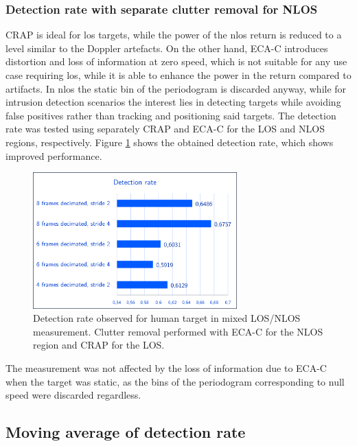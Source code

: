 \subsubsection{Detection rate with separate clutter removal for NLOS}

CRAP is ideal for \gls{los} targets, while the power of the \gls{nlos} return is reduced to a level similar to the Doppler artefacts.
On the other hand, ECA-C introduces distortion and loss of information at zero speed, which is not suitable for any use case requiring \gls{los}, while it is able to enhance the power in the return compared to artifacts. In \gls{nlos} the static bin of the periodogram is discarded anyway, while for intrusion detection scenarios the interest lies in detecting targets while avoiding false positives rather than tracking and positioning said targets.
The detection rate was tested using separately CRAP and ECA-C for the LOS and NLOS regions, respectively. Figure \ref{fig:Test1_detect_hist_crap-ecac} shows the obtained detection rate, which shows improved performance.
\begin{figure}[H]
	\centering
	\includegraphics[width=0.7\textwidth]{Images/Test1/detect_hist/detect_hist_human_ECAC_LMsans.png}
	\caption{\small Detection rate observed for human target in mixed LOS/NLOS measurement. Clutter removal performed with ECA-C for the NLOS region and CRAP for the LOS.}
	\label{fig:Test1_detect_hist_crap-ecac}
\end{figure}
The measurement was not affected by the loss of information due to ECA-C when the target was static, as the bins of the periodogram corresponding to null speed were discarded regardless.


\subsection{Moving average of detection rate}

